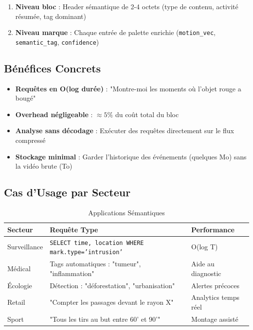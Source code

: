 \documentclass[12pt,a4paper]{article}
\begin{document}
	\begin{enumerate}[label=\textbf{Niveau \arabic*.}, leftmargin=*]
		\item \textbf{Niveau bloc} : Header sémantique de 2-4 octets (type de contenu, activité résumée, tag dominant)
		\item \textbf{Niveau marque} : Chaque entrée de palette enrichie (\texttt{motion\_vec}, \texttt{semantic\_tag}, \texttt{confidence})
	\end{enumerate}
	
	\subsection{Bénéfices Concrets}
	
	\begin{benefitbox}
		\begin{itemize}[leftmargin=*]
			\item \textbf{Requêtes en O(log durée)} : "Montre-moi les moments où l'objet rouge a bougé"
			\item \textbf{Overhead négligeable} : $\approx 5\%$ du coût total du bloc
			\item \textbf{Analyse sans décodage} : Exécuter des requêtes directement sur le flux compressé
			\item \textbf{Stockage minimal} : Garder l'historique des événements (quelques Mo) sans la vidéo brute (To)
		\end{itemize}
	\end{benefitbox}
	
	\subsection{Cas d'Usage par Secteur}
	
	\begin{table}[h]
		\centering
		\caption{Applications Sémantiques}
		\label{tab:semantique}
		\begin{tabular}{@{}lll@{}}
			\toprule
			\textbf{Secteur} & \textbf{Requête Type} & \textbf{Performance} \\ \midrule
			Surveillance & \texttt{SELECT time, location WHERE mark.type='intrusion'} & O(log T) \\
			Médical & Tags automatiques : "tumeur", "inflammation" & Aide au diagnostic \\
			Écologie & Détection : "déforestation", "urbanisation" & Alertes précoces \\
			Retail & "Compter les passages devant le rayon X" & Analytics temps réel \\
			Sport & "Tous les tirs au but entre 60' et 90'" & Montage assisté \\
			\bottomrule
		\end{tabular}
	\end{table}
	
\end{document}
